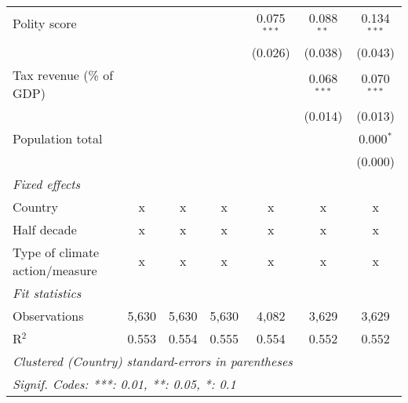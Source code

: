\begin{tabular}{lcccccc}
   Polity score                                                  &         &                &                & 0.075$^{***}$  & 0.088$^{**}$   & 0.134$^{***}$\\   
                                                                 &         &                &                & (0.026)        & (0.038)        & (0.043)\\   
   Tax revenue (\% of GDP)                                       &         &                &                &                & 0.068$^{***}$  & 0.070$^{***}$\\   
                                                                 &         &                &                &                & (0.014)        & (0.013)\\   
   Population total                                              &         &                &                &                &                & 0.000$^{*}$\\   
                                                                 &         &                &                &                &                & (0.000)\\   
   \emph{Fixed effects}\\
   Country                                                       & x       & x              & x              & x              & x              & x\\  
   Half decade                                                   & x       & x              & x              & x              & x              & x\\  
   Type of climate action/measure                                & x       & x              & x              & x              & x              & x\\  
   \midrule \emph{Fit statistics}\\
   Observations                                                  & 5,630   & 5,630          & 5,630          & 4,082          & 3,629          & 3,629\\  
   R$^2$                                                         & 0.553   & 0.554          & 0.555          & 0.554          & 0.552          & 0.552\\  
   \midrule
   \multicolumn{7}{l}{\emph{Clustered (Country) standard-errors in parentheses}}\\
   \multicolumn{7}{l}{\emph{Signif. Codes: ***: 0.01, **: 0.05, *: 0.1}}\\
\end{tabular}
\par\endgroup


